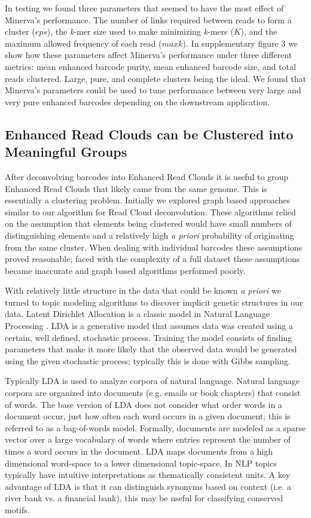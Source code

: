 In testing we found three parameters that seemed to have the most effect of Minerva's performance. The number of links required between reads to form a cluster ($eps$), the \textit{k}-mer size used to make minimizing \textit{k}-mers ($K$), and the maximum allowed frequency of each read ($maxk$). In supplementary figure 3 we show how these parameters affect Minerva's performance under three different metrics: mean enhanced barcode purity, mean enhanced barcode size, and total reads clustered. Large, pure, and complete clusters being the ideal. We found that Minerva's parameters could be used to tune performance between very large and very pure enhanced barcodes depending on the downstream application.

\subsection*{ Enhanced Read Clouds can be Clustered into Meaningful Groups}
\label{sec:LDA}

After deconvolving barcodes into Enhanced Read Clouds it is useful to group Enhanced Read Clouds that likely came from the same genome. This is essentially a clustering problem. Initially we explored graph based approaches similar to our algorithm for Read Cloud deconvolution. These algorithms relied on the assumption that elements being clustered would have small numbers of distinguishing elements and a relatively high {\it a priori} probability of originating from the same cluster. When dealing with individual barcodes these assumptions proved reasonable; faced with the complexity of a full dataset these assumptions became inaccurate and graph based algorithms performed poorly.

With relatively little structure in the data that could be known {\it a priori} we turned to topic modeling algorithms to discover implicit genetic structures in our data. Latent Dirichlet Allocation is a classic model in Natural Language Processing \citep{Blei2003}. LDA is a generative model that assumes data was created using a certain, well defined, stochastic process. Training the model consists of finding parameters that make it more likely that the observed data would be generated using the given stochastic process; typically this is done with Gibbs sampling.

Typically LDA is used to analyze corpora of natural language. Natural language corpora are organized into documents (e.g. emails or book chapters) that consist of words. The base version of LDA does not consider what order words in a document occur, just how often each word occurs in a given document; this is referred to as a bag-of-words model. Formally, documents are modeled as a sparse vector over a large vocabulary of words where entries represent the number of times a word occurs in the document. LDA maps documents from a high dimensional word-space to a lower dimensional topic-space. In NLP topics typically have intuitive interpretations as thematically consistent units. A key advantage of LDA is that it can distinguish synonyms based on context (i.e. a river bank vs. a financial bank), this may be useful for classifying conserved motifs.

